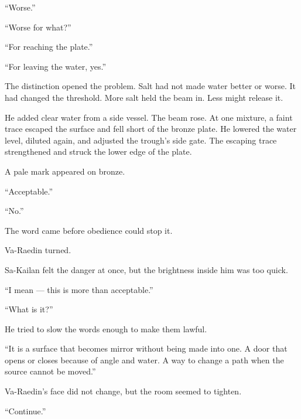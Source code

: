 “Worse.”\par

“Worse for what?”\par

“For reaching the plate.”\par

“For leaving the water, yes.”\par

The distinction opened the problem.
Salt had not made water better or worse.
It had changed the threshold.
More salt held the beam in.
Less might release it.\par

He added clear water from a side vessel.
The beam rose.
At one mixture, a faint trace escaped the surface and fell short of the bronze plate.
He lowered the water level, diluted again, and adjusted the trough’s side gate.
The escaping trace strengthened and struck the lower edge of the plate.\par

A pale mark appeared on bronze.\par

“Acceptable.”\par

“No.”\par

The word came before obedience could stop it.\par

Va-Raedin turned.\par

Sa-Kailan felt the danger at once, but the brightness inside him was too quick.\par

“I mean — this is more than acceptable.”\par

“What is it?”\par

He tried to slow the words enough to make them lawful.\par

“It is a surface that becomes mirror without being made into one.
A door that opens or closes because of angle and water.
A way to change a path when the source cannot be moved.”\par

Va-Raedin’s face did not change, but the room seemed to tighten.\par

“Continue.”\par

